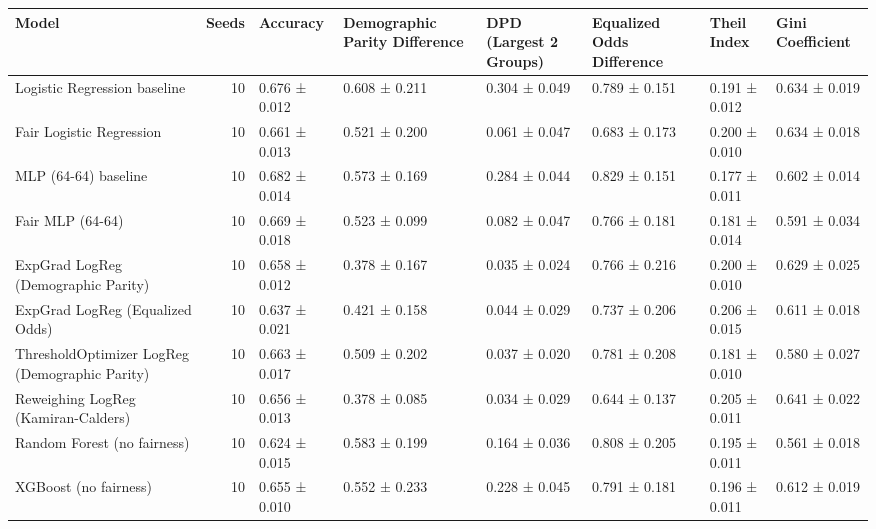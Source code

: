 \begin{tabular}{lrllllll}
\toprule
Model & Seeds & Accuracy & Demographic Parity Difference & DPD (Largest 2 Groups) & Equalized Odds Difference & Theil Index & Gini Coefficient \\
\midrule
Logistic Regression baseline & 10 & 0.676 ± 0.012 & 0.608 ± 0.211 & 0.304 ± 0.049 & 0.789 ± 0.151 & 0.191 ± 0.012 & 0.634 ± 0.019 \\
Fair Logistic Regression & 10 & 0.661 ± 0.013 & 0.521 ± 0.200 & 0.061 ± 0.047 & 0.683 ± 0.173 & 0.200 ± 0.010 & 0.634 ± 0.018 \\
MLP (64-64) baseline & 10 & 0.682 ± 0.014 & 0.573 ± 0.169 & 0.284 ± 0.044 & 0.829 ± 0.151 & 0.177 ± 0.011 & 0.602 ± 0.014 \\
Fair MLP (64-64) & 10 & 0.669 ± 0.018 & 0.523 ± 0.099 & 0.082 ± 0.047 & 0.766 ± 0.181 & 0.181 ± 0.014 & 0.591 ± 0.034 \\
ExpGrad LogReg (Demographic Parity) & 10 & 0.658 ± 0.012 & 0.378 ± 0.167 & 0.035 ± 0.024 & 0.766 ± 0.216 & 0.200 ± 0.010 & 0.629 ± 0.025 \\
ExpGrad LogReg (Equalized Odds) & 10 & 0.637 ± 0.021 & 0.421 ± 0.158 & 0.044 ± 0.029 & 0.737 ± 0.206 & 0.206 ± 0.015 & 0.611 ± 0.018 \\
ThresholdOptimizer LogReg (Demographic Parity) & 10 & 0.663 ± 0.017 & 0.509 ± 0.202 & 0.037 ± 0.020 & 0.781 ± 0.208 & 0.181 ± 0.010 & 0.580 ± 0.027 \\
Reweighing LogReg (Kamiran-Calders) & 10 & 0.656 ± 0.013 & 0.378 ± 0.085 & 0.034 ± 0.029 & 0.644 ± 0.137 & 0.205 ± 0.011 & 0.641 ± 0.022 \\
Random Forest (no fairness) & 10 & 0.624 ± 0.015 & 0.583 ± 0.199 & 0.164 ± 0.036 & 0.808 ± 0.205 & 0.195 ± 0.011 & 0.561 ± 0.018 \\
XGBoost (no fairness) & 10 & 0.655 ± 0.010 & 0.552 ± 0.233 & 0.228 ± 0.045 & 0.791 ± 0.181 & 0.196 ± 0.011 & 0.612 ± 0.019 \\
\bottomrule
\end{tabular}
